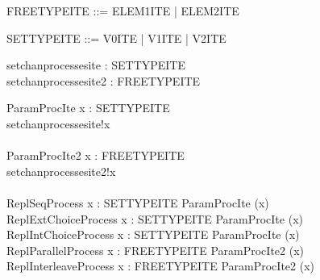 \begin{zed}
   FREETYPEITE ::= ELEM1ITE | ELEM2ITE
\end{zed}

\begin{zed}
   SETTYPEITE ::= V0ITE | V1ITE | V2ITE
\end{zed}

\begin{circus}
 \circchannel setchanprocessesite : SETTYPEITE \\
 \circchannel setchanprocessesite2 : FREETYPEITE \\
\end{circus}
\begin{circus}
\circprocess ParamProcIte \circdef x : SETTYPEITE \circspot \circbegin \\
   \circspot setchanprocessesite!x \then \Skip \\
\circend \\

\circprocess ParamProcIte2 \circdef x : FREETYPEITE \circspot \circbegin \\ %
   \circspot setchanprocessesite2!x \then \Skip \\
\circend \\

\circprocess ReplSeqProcess \circdef \Semi x : SETTYPEITE \circspot ParamProcIte (x) \\
\circprocess ReplExtChoiceProcess \circdef \Extchoice x : SETTYPEITE \circspot ParamProcIte (x) \\
\circprocess ReplIntChoiceProcess \circdef \Intchoice x : SETTYPEITE \circspot ParamProcIte (x) \\
\circprocess ReplParallelProcess \circdef \lpar \lchanset \rchanset \rpar x : FREETYPEITE \circspot ParamProcIte2 (x) \\
\circprocess ReplInterleaveProcess \circdef \Interleave x : FREETYPEITE \circspot ParamProcIte2 (x) \\
\end{circus}
